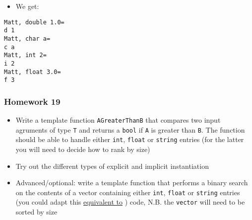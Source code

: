 \begin{Shaded}
\begin{Highlighting}[]

\NormalTok{\{}
  \NormalTok{ << }
\NormalTok{);}
  \NormalTok{ << }
\NormalTok{);}
  \NormalTok{ << }
\NormalTok{);}
  \NormalTok{ << }
\NormalTok{>(}\NormalTok{<}\NormalTok{>(}\NormalTok{));  }
\NormalTok{\}}
\end{Highlighting}
\end{Shaded}

\begin{itemize}
\tightlist
\item
  We get:
\end{itemize}

\begin{verbatim}
Matt, double 1.0=
d 1
Matt, char a=
c a
Matt, int 2=
i 2
Matt, float 3.0=
f 3
\end{verbatim}

\hypertarget{homework-19}{%
\subsubsection{Homework 19}\label{homework-19}}

\begin{itemize}
\tightlist
\item
  Write a template function \texttt{AGreaterThanB} that compares two
  input agruments of type \texttt{T} and returns a \texttt{bool} if
  \texttt{A} is greater than \texttt{B}. The function should be able to
  handle either \texttt{int}, \texttt{float} or \texttt{string} entries
  (for the latter you will need to decide how to rank by size)
\item
  Try out the different types of explicit and implicit instantiation
\item
  Advanced/optional: write a template function that performs a binary
  search on the contents of a vector containing either \texttt{int},
  \texttt{float} or \texttt{string} entries (you could adapt this
  \href{http://www.cplusplus.com/reference/algorithm/find/}{equivalent
  to} ) code, N.B. the \texttt{vector} will need to be sorted by size
\end{itemize}

